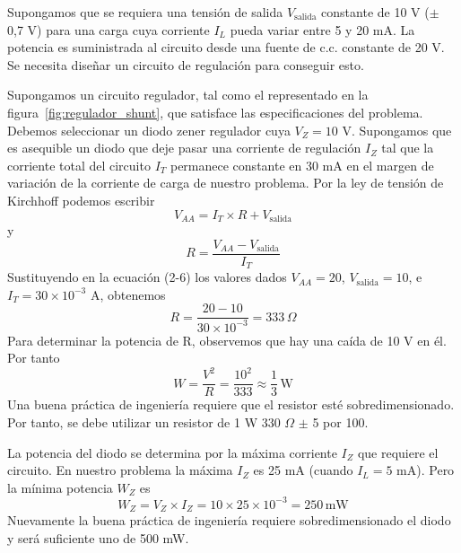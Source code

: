 \documentclass[12pt,a4paper]{article}
\begin{document}
Supongamos que se requiera una tensión de salida $V_{\text{salida}}$ constante de 10 V ($\pm$ 0,7 V) para una carga cuya corriente $I_L$ pueda variar entre 5 y 20 mA. La potencia es suministrada al circuito desde una fuente de c.c. constante de 20 V. Se necesita diseñar un circuito de regulación para conseguir esto.

Supongamos un circuito regulador, tal como el representado en la figura~\ref{fig:regulador_shunt}, que satisface las especificaciones del problema. Debemos seleccionar un diodo zener regulador cuya $V_Z = 10$ V. Supongamos que es asequible un diodo que deje pasar una corriente de regulación $I_Z$ tal que la corriente total del circuito $I_T$ permanece constante en 30 mA en el margen de variación de la corriente de carga de nuestro problema. Por la ley de tensión de Kirchhoff podemos escribir
\begin{equation}
    V_{AA} = I_T \times R + V_{\text{salida}}
\end{equation}
y
\begin{equation}
    R = \frac{V_{AA} - V_{\text{salida}}}{I_T}
\end{equation}
Sustituyendo en la ecuación (2-6) los valores dados $V_{AA} = 20$, $V_{\text{salida}} = 10$, e $I_T = 30 \times 10^{-3}$ A, obtenemos
\[ R = \frac{20 - 10}{30 \times 10^{-3}} = 333 \, \Omega \]
Para determinar la potencia de R, observemos que hay una caída de 10 V en él. Por tanto
\[ W = \frac{V^2}{R} = \frac{10^2}{333} \approx \frac{1}{3} \, \text{W} \]
Una buena práctica de ingeniería requiere que el resistor esté sobredimensionado. Por tanto, se debe utilizar un resistor de 1 W 330 $\Omega$ $\pm$ 5 por 100.

La potencia del diodo se determina por la máxima corriente $I_Z$ que requiere el circuito. En nuestro problema la máxima $I_Z$ es 25 mA (cuando $I_L = 5$ mA). Pero la mínima potencia $W_Z$ es
\begin{equation}
    W_Z = V_Z \times I_Z = 10 \times 25 \times 10^{-3} = 250 \, \text{mW}
\end{equation}
Nuevamente la buena práctica de ingeniería requiere sobredimensionado el diodo y será suficiente uno de 500 mW.

\newpage
\end{document}
